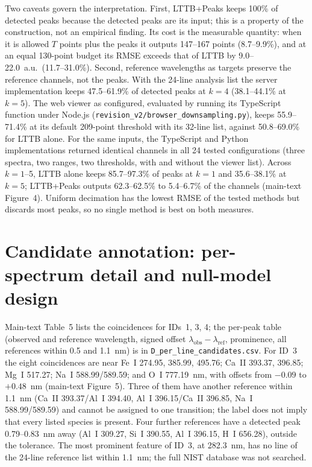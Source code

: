 \documentclass[10pt,a4paper]{article}
\begin{document}
Two caveats govern the interpretation. First, LTTB+Peaks keeps 100\% of detected peaks because the detected peaks are its input; this is a property of the construction, not an empirical finding. Its cost is the measurable quantity: when it is allowed $T$ points plus the peaks it outputs 147--167 points (8.7--9.9\%), and at an equal 130-point budget its RMSE exceeds that of LTTB by 9.0--22.0~a.u.\ (11.7--31.0\%). Second, reference wavelengths as targets preserve the reference channels, not the peaks. With the 24-line analysis list the server implementation keeps 47.5--61.9\% of detected peaks at $k=4$ (38.1--44.1\% at $k=5$). The web viewer as configured, evaluated by running its TypeScript function under Node.js (\texttt{revision\_v2/browser\_downsampling.py}), keeps 55.9--71.4\% at its default 209-point threshold with its 32-line list, against 50.8--69.0\% for LTTB alone. For the same inputs, the TypeScript and Python implementations returned identical channels in all 24 tested configurations (three spectra, two ranges, two thresholds, with and without the viewer list). Across $k=1$--5, LTTB alone keeps 85.7--97.3\% of peaks at $k=1$ and 35.6--38.1\% at $k=5$; LTTB+Peaks outputs 62.3--62.5\% to 5.4--6.7\% of the channels (main-text Figure~4). Uniform decimation has the lowest RMSE of the tested methods but discards most peaks, so no single method is best on both measures.

\section{Candidate annotation: per-spectrum detail and null-model design}

Main-text Table~5 lists the coincidences for IDs~1, 3, 4; the per-peak table (observed and reference wavelength, signed offset $\lambda_{\mathrm{obs}}-\lambda_{\mathrm{ref}}$, prominence, all references within 0.5 and 1.1~nm) is in \texttt{D\_per\_line\_candidates.csv}. For ID~3 the eight coincidences are near Fe~I 274.95, 385.99, 495.76; Ca~II 393.37, 396.85; Mg~I 517.27; Na~I 588.99/589.59; and O~I 777.19~nm, with offsets from $-0.09$ to $+0.48$~nm (main-text Figure~5). Three of them have another reference within 1.1~nm (Ca~II 393.37/Al~I 394.40, Al~I 396.15/Ca~II 396.85, Na~I 588.99/589.59) and cannot be assigned to one transition; the label does not imply that every listed species is present. Four further references have a detected peak 0.79--0.83~nm away (Al~I 309.27, Si~I 390.55, Al~I 396.15, H~I 656.28), outside the tolerance. The most prominent feature of ID~3, at 282.3~nm, has no line of the 24-line reference list within 1.1~nm; the full NIST database was not searched.
\end{document}
